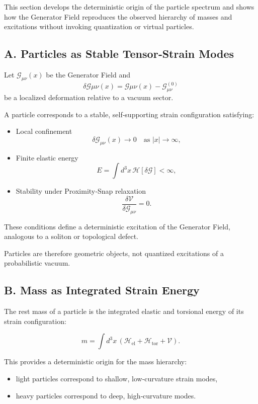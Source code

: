 \documentclass[reprint,amsmath,amssymb,aps,prl,floatfix]{revtex4-2}
\begin{document}
This section develops the deterministic origin of the particle spectrum and shows how the Generator Field reproduces the observed hierarchy of masses and excitations without invoking quantization or virtual particles.

\subsection{A. Particles as Stable Tensor‑Strain Modes}

Let \(\mathcal{G}_{\mu\nu}(x)\) be the Generator Field and  
\[
\delta\mathcal{G}{\mu\nu}(x) = \mathcal{G}{\mu\nu}(x) - \mathcal{G}_{\mu\nu}^{(0)}
\]  
be a localized deformation relative to a vacuum sector.
\medskip

A particle corresponds to a stable, self‑supporting strain configuration satisfying:
\medskip
\begin{itemize}
\item Local confinement  
   \[
   \delta\mathcal{G}_{\mu\nu}(x) \rightarrow 0 \quad \text{as } |x|\rightarrow\infty,
   \]

\item Finite elastic energy  
   \[
   E = \int d^3x\,\mathcal{H}[\delta\mathcal{G}] < \infty,
   \]

\item Stability under Proximity‑Snap relaxation  
   \[
   \frac{\delta \mathcal{V}}{\delta \mathcal{G}_{\mu\nu}} = 0.
   \]

\end{itemize}

These conditions define a deterministic excitation of the Generator Field, analogous to a soliton or topological defect.
\medskip

Particles are therefore geometric objects, not quantized excitations of a probabilistic vacuum.

\subsection{B. Mass as Integrated Strain Energy}

The rest mass of a particle is the integrated elastic and torsional energy of its strain configuration:

\[
m = \int d^3x\,
\left(
\mathcal{H}_{\mathrm{el}}
+
\mathcal{H}_{\mathrm{tor}}
+
\mathcal{V}
\right).
\]

This provides a deterministic origin for the mass hierarchy:
\begin{itemize}
\item light particles correspond to shallow, low‑curvature strain modes,  
\item heavy particles correspond to deep, high‑curvature modes.
\end{itemize}
\end{document}
